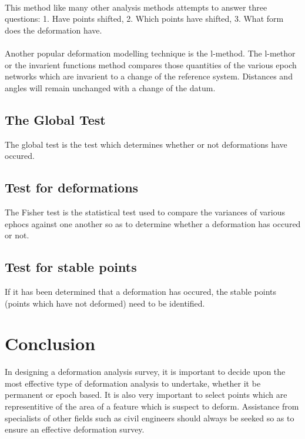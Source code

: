\documentclass{article}
\begin{document}
\paragraph{}
This method like many other analysis methods attempts to answer three questions:
1. Have points shifted, 2. Which points have shifted, 3. What form does the deformation 
have.
\paragraph{}
Another popular deformation modelling technique is the l-method. The l-methor or the
invarient functions method compares those quantities of the various epoch networks
which are invarient to a change of the reference system. Distances and angles will
remain unchanged with a change of the datum.

\subsection{The Global Test}
The global test is the test which determines whether or not deformations have occured.

\subsection{Test for deformations}
The Fisher test is the statistical test used to compare the variances of various ephocs
against one another so as to determine whether a deformation has occured or not.

\subsection{Test for stable points}
If it has been determined that a deformation has occured, the stable points (points
which have not deformed) need to be identified.

\section{Conclusion}
In designing a deformation analysis survey, it is important to decide upon the most
effective type of deformation analysis to undertake, whether it be permanent or epoch 
based. It is also very important to select points which are representitive of the area
of a feature which is suspect to deform. Assistance from specialists of other fields such as civil
engineers should always be seeked so as to ensure an effective deformation survey.
\end{document}
